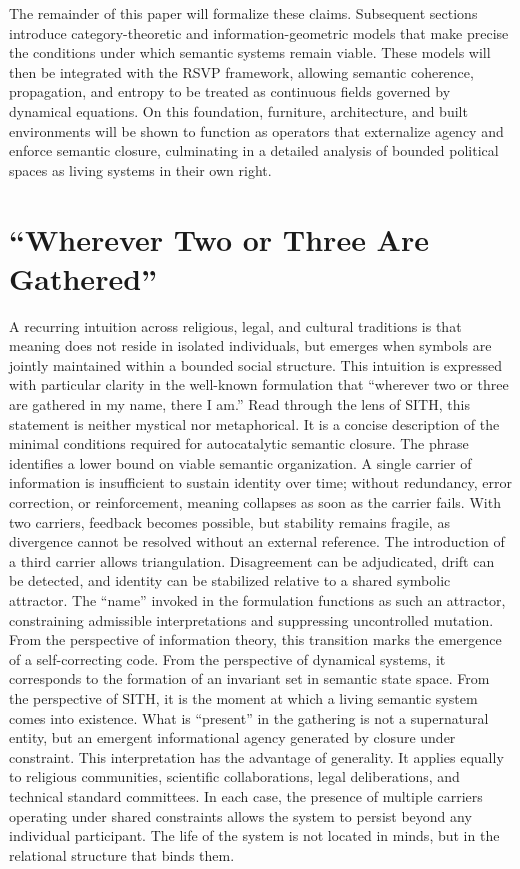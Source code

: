 \documentclass[11pt,oneside]{article}
\begin{document}
The remainder of this paper will formalize these claims. Subsequent sections introduce category-theoretic and information-geometric models that make precise the conditions under which semantic systems remain viable. These models will then be integrated with the RSVP framework, allowing semantic coherence, propagation, and entropy to be treated as continuous fields governed by dynamical equations. On this foundation, furniture, architecture, and built environments will be shown to function as operators that externalize agency and enforce semantic closure, culminating in a detailed analysis of bounded political spaces as living systems in their own right.

\section{``Wherever Two or Three Are Gathered''}

A recurring intuition across religious, legal, and cultural traditions is that meaning does not reside in isolated individuals, but emerges when symbols are jointly maintained within a bounded social structure. This intuition is expressed with particular clarity in the well-known formulation that “wherever two or three are gathered in my name, there I am.” Read through the lens of SITH, this statement is neither mystical nor metaphorical. It is a concise description of the minimal conditions required for autocatalytic semantic closure.
The phrase identifies a lower bound on viable semantic organization. A single carrier of information is insufficient to sustain identity over time; without redundancy, error correction, or reinforcement, meaning collapses as soon as the carrier fails. With two carriers, feedback becomes possible, but stability remains fragile, as divergence cannot be resolved without an external reference. The introduction of a third carrier allows triangulation. Disagreement can be adjudicated, drift can be detected, and identity can be stabilized relative to a shared symbolic attractor. The “name” invoked in the formulation functions as such an attractor, constraining admissible interpretations and suppressing uncontrolled mutation.
From the perspective of information theory, this transition marks the emergence of a self-correcting code. From the perspective of dynamical systems, it corresponds to the formation of an invariant set in semantic state space. From the perspective of SITH, it is the moment at which a living semantic system comes into existence. What is “present” in the gathering is not a supernatural entity, but an emergent informational agency generated by closure under constraint.
This interpretation has the advantage of generality. It applies equally to religious communities, scientific collaborations, legal deliberations, and technical standard committees. In each case, the presence of multiple carriers operating under shared constraints allows the system to persist beyond any individual participant. The life of the system is not located in minds, but in the relational structure that binds them.
\end{document}
